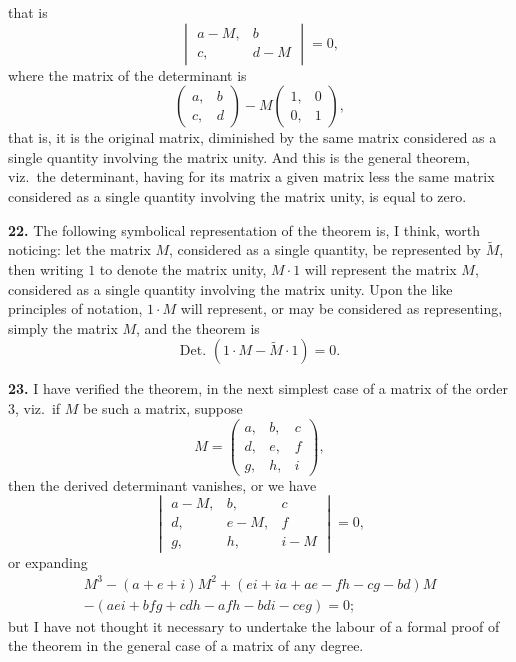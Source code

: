 \documentclass[12pt,a4paper]{article}
\theoremstyle{definition}
\begin{document}
that is
\[
\begin{vmatrix} a-M, & b \\ c, & d-M \end{vmatrix} = 0,
\]
where the matrix of the determinant is
\[
\begin{pmatrix} a, & b \\ c, & d \end{pmatrix} - M\begin{pmatrix} 1, & 0 \\ 0, & 1 \end{pmatrix},
\]
that is, it is the original matrix, diminished by the same matrix considered as a single quantity involving the matrix unity. And this is the general theorem, viz.\ the determinant, having for its matrix a given matrix less the same matrix considered as a single quantity involving the matrix unity, is equal to zero.

\medskip
\noindent\textbf{22.} The following symbolical representation of the theorem is, I think, worth noticing: let the matrix $M$, considered as a single quantity, be represented by $\tilde{M}$, then writing $1$ to denote the matrix unity, $M \cdot 1$ will represent the matrix $M$, considered as a single quantity involving the matrix unity. Upon the like principles of notation, $1 \cdot M$ will represent, or may be considered as representing, simply the matrix $M$, and the theorem is
\[\text{Det. }(1 \cdot M - \tilde{M} \cdot 1) = 0.\]

\medskip
\noindent\textbf{23.} I have verified the theorem, in the next simplest case of a matrix of the order 3, viz.\ if $M$ be such a matrix, suppose
\[
M = \begin{pmatrix} a, & b, & c \\ d, & e, & f \\ g, & h, & i \end{pmatrix},
\]
then the derived determinant vanishes, or we have
\[
\begin{vmatrix}
a-M, & b, & c \\
d, & e-M, & f \\
g, & h, & i-M
\end{vmatrix} = 0,
\]
or expanding
\begin{multline*}
M^3 - (a+e+i)M^2 + (ei+ia+ae-fh-cg-bd)M \\
- (aei+bfg+cdh-afh-bdi-ceg) = 0;
\end{multline*}
but I have not thought it necessary to undertake the labour of a formal proof of the theorem in the general case of a matrix of any degree.
\end{document}
